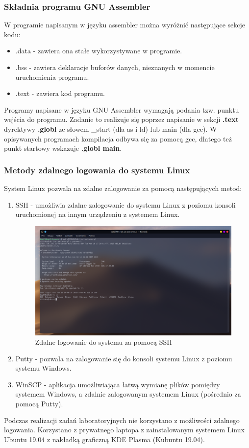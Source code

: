 \documentclass[a4paper,12pt]{article}
\begin{document}
\subsubsection{Składnia programu GNU Assembler}
W programie napisanym w języku assembler można wyróżnić następujące sekcje kodu:
\begin{itemize}
	\item .data - zawiera ona stałe wykorzystywane w programie.
	\item .bss - zawiera deklaracje buforów danych, nieznanych w momencie uruchomienia programu.
	\item .text - zawiera kod programu.
\end{itemize}
Programy napisane w języku GNU Assembler wymagają podania tzw. punktu wejścia do programu. Zadanie to realizuje się poprzez napisanie w sekcji \textbf{.text} dyrektywy \textbf{.globl} ze słowem \_start (dla as i ld) lub main (dla gcc). W opisywanych programach kompilacja odbywa się za pomocą gcc, dlatego też punkt startowy wskazuje \textbf{.globl main}.
\newpage
\subsubsection{Metody zdalnego logowania do systemu Linux}
System Linux pozwala na zdalne zalogowanie za pomocą następujących metod:
\begin{enumerate}
	\item SSH - umożliwia zdalne zalogowanie do systemu Linux z poziomu konsoli uruchomionej na innym urządzeniu z systemem Linux.
	\begin{center}
		\begin{figure}[h]
			\centering\includegraphics[width=17cm]{Materialy/Lab0/ssh}
			\caption{Zdalne logowanie do systemu za pomocą SSH}
			\label{ssh}
		\end{figure}
	\end{center}
	\item Putty - pozwala na zalogowanie się do konsoli systemu Linux z poziomu systemu Windows.
	\item WinSCP - aplikacja umożliwiająca łatwą wymianę plików pomiędzy systemem Windows, a zdalnie zalogowanym systemem Linux (pośrednio za pomocą Putty).
\end{enumerate}
Podczas realizacji zadań laboratoryjnych nie korzystano z możliwości zdalnego logowania. Korzystano z prywatnego laptopa z zainstalowanym systemem Linux Ubuntu 19.04 z nakładką graficzną KDE Plasma (Kubuntu 19.04).
\end{document}
